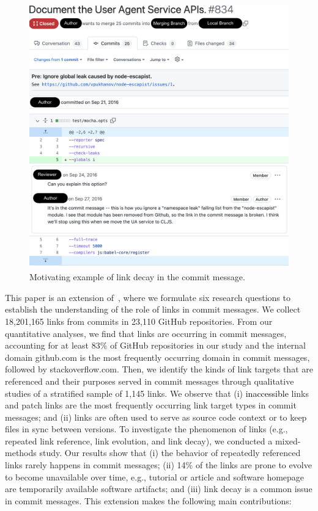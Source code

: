 \documentclass[smallextended]{svjour3}       %
\newcommand{\minor}[1]{\textcolor{black}{#1}}
\begin{document}
\begin{figure}[t]
  \centering
    \includegraphics[width=\textwidth]{motivating_example.png}
  \caption{Motivating example of link decay in the commit message.}
  \label{fig:motivating}
\end{figure}

This paper is an extension of~\cite{hata20199}, where we formulate six research questions to establish the understanding of the role of links in commit messages.
We collect 18,201,165 links from commits in 23,110 GitHub repositories. From our quantitative analyses, we find that links are occurring in commit messages, accounting for at least 83\% of GitHub repositories in our study and the internal domain \textsf{github.com} is the most frequently occurring domain in commit messages, followed by \textsf{stackoverflow.com}. Then, we identify the kinds of link targets that are referenced and their purposes served in commit messages through qualitative studies of a stratified sample of 1,145 links. We observe that (i) \minor{inaccessible} links and patch links are the most frequently occurring link target types in commit messages; and (ii) links are often used to serve as source code context or to keep files in sync between versions.
To investigate the phenomenon of links (e.g., repeated link reference, link evolution, and link decay), we conducted a mixed-methods study. Our results show that (i) the behavior of repeatedly referenced links rarely happens in commit messages; (ii) 14\% of the links are prone to evolve to become unavailable over time, e.g., tutorial or article and software homepage are temporarily available software artifacts; and (iii) link decay is a common issue in commit messages. This extension makes the following main contributions:
\end{document}
